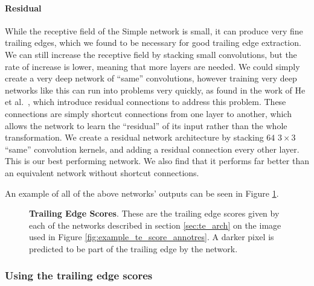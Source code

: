 \paragraph{Residual}
While the receptive field of the Simple network is small, it can produce very fine trailing edges, which we found to be necessary for good trailing edge extraction.
We can still increase the receptive field by stacking small convolutions, but the rate of increase is lower, meaning that more layers are needed.
We could simply create a very deep network of ``same'' convolutions, however training very deep networks like this can run into problems very quickly, as found in the work of He et al.\ \cite{he2015deep}, which introduce residual connections to address this problem.
These connections are simply shortcut connections from one layer to another, which allows the network to learn the ``residual'' of its input rather than the whole transformation.
We create a residual network architecture by stacking $64$ $3\times3$ ``same'' convolution kernels, and adding a residual connection every other layer.
This is our best performing network.
We also find that it performs far better than an equivalent network without shortcut connections.

An example of all of the above networks' outputs can be seen in Figure \ref{fig:example_te_scores_all}.

\begin{figure}[t]%
\centering
{}
\newline
{}
\caption{\textbf{Trailing Edge Scores}. These are the trailing edge scores given by each of the networks described in section \ref{sec:te_arch} on the image used in Figure \ref{fig:example_te_score_annotres}. A darker pixel is predicted to be part of the trailing edge by the network.}
\label{fig:example_te_scores_all}
\end{figure}

\subsubsection{Using the trailing edge scores}

